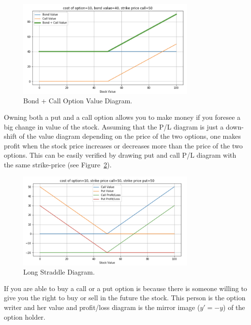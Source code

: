\begin{figure}[h!]
\centering
\includegraphics[width=0.8\textwidth]{images/diagrams4.png}
\caption{Bond + Call Option Value Diagram.}
\label{fig:BCValue}
\end{figure}


Owning both a put and a call option allows you to make money if you foresee a big change in value of the stock. Assuming that the P/L diagram is just a down-shift of the value diagram depending on the price of the two options, one makes profit when the stock price increases or decreases more than the price of the two options. This can be easily verified by drawing put and call P/L diagram with the same strike-price (see Figure~\ref{fig:long_straddle}).

\begin{figure}[h!]
\centering
\includegraphics[width=0.8\textwidth]{images/long_straddle.png}
\caption{Long Straddle Diagram.}
\label{fig:long_straddle}
\end{figure}


If you are able to buy a call or a put option is because there is someone willing to give you the right to buy or sell in the future the stock. This person is the option writer and her value and profit/loss diagram is the mirror image ($y' = - y$) of the option holder.


